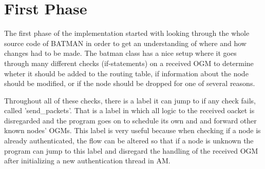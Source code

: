 \section{First Phase}
The first phase of the implementation started with looking through the whole
source code of BATMAN in order to get an understanding of where and how changes
had to be made. The batman class has a nice setup where it goes through many
different checks (if-statements) on a received \ac{OGM} to determine wheter it
should be added to the routing table, if information about the node should be
modified, or if the node should be dropped for one of several reasons.

Throughout all of these checks, there is a label it can jump to if any check
fails, called 'send\_packets'. That is a label in which all logic to the
received oacket is disregarded and the program goes on to schedule its own and and
forward other known nodes' \ac{OGM}s. This label is very useful because when
checking if a node is already authenticated, the flow can be altered so that if
a node is unknown the program can jump to this label and disregard the handling
of the received \ac{OGM} after initializing a new authentication thread in
\ac{AM}.
